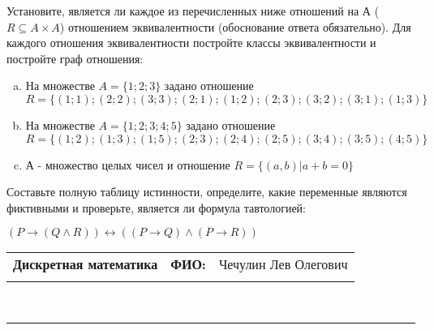 \documentclass[10pt]{exam}
\newcommand{\class}{Дискретная математика}
\newcommand{\examdate}{}
\begin{document}
\begin{questions}
\question
Установите, является ли каждое из перечисленных ниже отношений на А ($R \subseteq A \times A$) отношением эквивалентности (обоснование ответа обязательно). Для каждого отношения эквивалентности постройте классы 
эквивалентности и постройте граф отношения:
\begin{enumerate} [a)]\setcounter{enumi}{0}
\item На множестве $A = \{1; 2; 3\}$ задано отношение $R = \{(1; 1); (2; 2); (3; 3); (2; 1); (1; 2); (2; 3); (3; 2); (3; 1); (1; 3)\}$
\item На множестве $A = \{1; 2; 3; 4; 5\}$ задано отношение $R = \{(1; 2); (1; 3); (1; 5); (2; 3); (2; 4); (2; 5); (3; 4); (3; 5); (4; 5)\}$
\item А - множество целых чисел и отношение $R = \{(a,b)|a + b = 0\}$
\end{enumerate}\question Составьте полную таблицу истинности, определите, какие переменные являются фиктивными и проверьте, является ли формула тавтологией:

$(P \rightarrow (Q \land R)) \leftrightarrow ((P \rightarrow Q) \land (P \rightarrow R))$

\end{questions}
\newpage
\begin{flushright}
\begin{tabular}{p{2.8in} r l}
\textbf{\class} & \textbf{ФИО:} &Чечулин Лев Олегович
\\

\textbf{\examdate} &&\\
\end{tabular}\\
\end{flushright}
\rule[1ex]{\textwidth}{.1pt}
\end{document}
